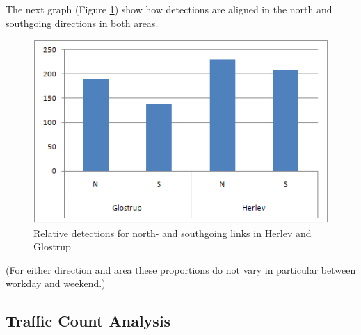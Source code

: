 The next graph (Figure \ref{fig:detector_directions}) show how detections are aligned in the north and southgoing directions in both areas. 

\begin{figure}[!ht]
\begin{center}
\includegraphics[scale=0.4]{detector_directions.png} 
\end{center}
\caption{Relative detections for north- and southgoing links in Herlev and Glostrup}
\label{fig:detector_directions}
\end{figure}

(For either direction and area these proportions do not vary in particular between workday and weekend.)

\subsection{Traffic Count Analysis}
\label{traffic_count_analysis}